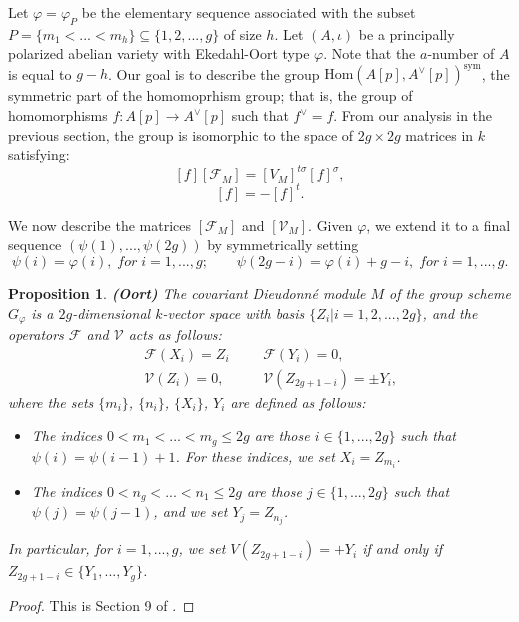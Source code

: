 \documentclass[a4paper,12pt,twoside]{report}
\newtheorem{proposition}[theorem]{Proposition}
\newcommand{\Hom}{\mathrm{Hom}}
\newcommand{\sym}{\mathrm{sym}}
\begin{document}
Let $\varphi=\varphi_P$ be the elementary sequence associated with the subset $P=\{m_1<...<m_h\}\subseteq\{1,2,...,g\}$ of size $h$. 
Let $(A,\iota)$ be a principally polarized abelian variety with Ekedahl-Oort type $\varphi$. 
Note that the $a$-number of $A$ is equal to $g-h$. 
Our goal is to describe the group $\Hom(A[p],A^{\vee}[p])^{\sym}$, 
the symmetric part of the homomoprhism group; 
that is, the group of homomorphisms $f:A[p]\rightarrow A^\vee[p]$ such that $f^{\vee}=f$. 
From our analysis in the previous section, the group is isomorphic to the space of $2g\times 2g$ 
matrices in $k$ satisfying: 
\[[f][\mathcal{F}_M]=[V_M]^{t\sigma}[f]^\sigma,\]
\[[f]=-[f]^t.\]

We now describe the matrices $[\mathcal{F}_M]$ and $[\mathcal{V}_M]$. 
Given $\varphi$, we extend it to a final sequence $(\psi(1),...,\psi(2g))$ by symmetrically setting 
\[\psi(i)=\varphi(i), \;for\; i=1,...,g; \qquad \psi(2g-i)=\varphi(i)+g-i, \; for\; i=1,...,g.\]

\begin{proposition}\emph{\textbf{(Oort)}}
    The covariant Dieudonné module $M$ of the group scheme $G_{\varphi}$ 
    is a $2g$-dimensional $k$-vector space with basis $\{Z_i|i=1,2,...,2g\}$,
    and the operators $\mathcal{F}$ and $\mathcal{V}$ acts as follows: 
    \[\begin{aligned}
        &&\mathcal{F}(X_i)=Z_i&&&\mathcal{F}(Y_i)=0,\\
        &&\mathcal{V}(Z_i)=0,&&&\mathcal{V}(Z_{2g+1-i})=\pm Y_i,
    \end{aligned}\]
    where the sets $\{m_i\}$, $\{n_i\}$, $\{X_i\}$, $Y_i$ are defined as follows: 
    \begin{itemize}
        \item The indices $0<m_1<...<m_g\leqslant 2g$ are those $i\in\{1,...,2g\}$ such that $\psi(i)=\psi(i-1)+1$. 
        For these indices, we set $X_i=Z_{m_i}$.
        \item The indices $0<n_g<...<n_1\leqslant 2g$ are those $j\in\{1,...,2g\}$ such that $\psi(j)=\psi(j-1)$, and we set $Y_j=Z_{n_j}$.
    \end{itemize} 
    In particular, for $i=1,...,g$, we set $V(Z_{2g+1-i})=+Y_i$ if and only if $Z_{2g+1-i}\in \{Y_1,...,Y_g\}$.  
\end{proposition}

\begin{proof}
    This is Section 9 of \cite{Oo1}.
\end{proof}
\end{document}
